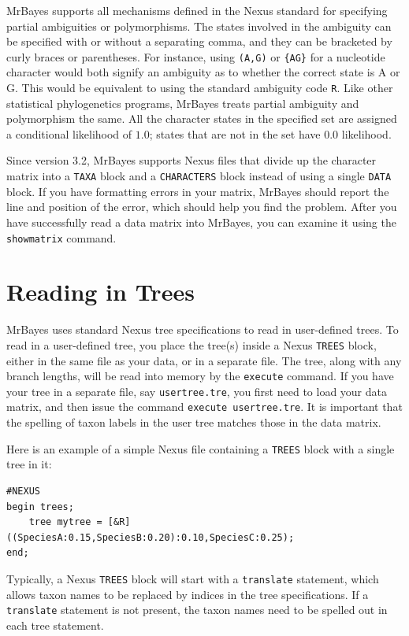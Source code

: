 \documentclass[12pt]{book}
\begin{document}
MrBayes supports all mechanisms defined in the Nexus standard for specifying partial ambiguities or
polymorphisms. The states involved in the ambiguity can be specified with or without a separating
comma, and they can be bracketed by curly braces or parentheses. For instance, using \texttt{(A,G)}
or \texttt{\{AG\}} for a nucleotide character would both signify an ambiguity as to whether the
correct state is A or G. This would be equivalent to using the standard ambiguity code \texttt{R}.
Like other statistical phylogenetics programs, MrBayes treats partial ambiguity and polymorphism
the same. All the character states in the specified set are assigned a conditional likelihood of
$1.0$; states that are not in the set have $0.0$ likelihood.

Since version 3.2, MrBayes supports Nexus files that divide up the character matrix into a
\texttt{TAXA} block and a \texttt{CHARACTERS} block instead of using a single \texttt{DATA} block.
If you have formatting errors in your matrix, MrBayes should report the line and position of the
error, which should help you find the problem. After you have successfully read a data matrix into
MrBayes, you can examine it using the \texttt{showmatrix} command.

\section{Reading in Trees}

MrBayes uses standard Nexus tree specifications to read in user-defined trees. To read in a
user-defined tree, you place the tree(s) inside a Nexus \texttt{TREES} block, either in the same
file as your data, or in a separate file. The tree, along with any branch lengths, will be read
into memory by the \texttt{execute} command. If you have your tree in a separate file, say
\texttt{usertree.tre}, you first need to load your data matrix, and then issue the command
\texttt{execute usertree.tre}. It is important that the spelling of taxon labels in the user tree
matches those in the data matrix. 

Here is an example of a simple Nexus file containing a \texttt{TREES} block with a single tree in
it:

\begin{Verbatim}
#NEXUS
begin trees;
    tree mytree = [&R] ((SpeciesA:0.15,SpeciesB:0.20):0.10,SpeciesC:0.25);
end;
\end{Verbatim}

Typically, a Nexus \texttt{TREES} block will start with a \texttt{translate} statement, which
allows taxon names to be replaced by indices in the tree specifications. If a \texttt{translate}
statement is not present, the taxon names need to be spelled out in each tree statement.
\end{document}
